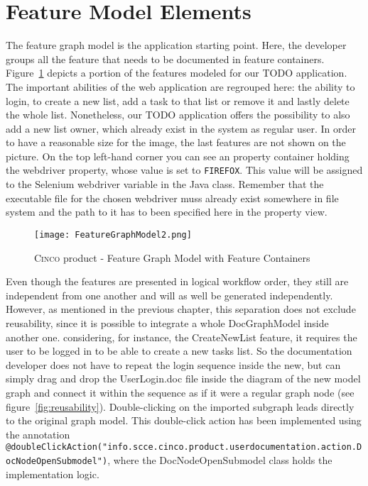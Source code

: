 \section{Feature Model Elements}\label{sec:FeatModElem}

The feature graph model is the application starting point. Here, the developer groups all the feature that needs to be documented in feature containers. Figure~\ref{fig:featGraph} depicts a portion of the features modeled for our TODO application. The important abilities of the web application are regrouped here: the ability to login, to create a new list, add a task to that list or remove it and lastly delete the whole list. Nonetheless, our TODO application offers the possibility to also add a new list owner, which already exist in the system as regular user. In order to have a reasonable size for the image, the last features are not shown on the picture. On the top left-hand corner you can see an property container holding the webdriver property, whose value is set to \lstinline[language=MGL]{FIREFOX}. This value will be assigned to the Selenium webdriver variable in the Java class. Remember that the executable file for the chosen webdriver muss already exist somewhere in file system and the path to it has to been specified here in the property view.

\begin{figure}[H]
    \centering
    \texttt{[image: FeatureGraphModel2.png]}
    \caption{\textsc{Cinco} product - Feature Graph Model with Feature Containers}
    \label{fig:featGraph}
\end{figure}

Even though the features are presented in logical workflow order, they still are independent from one another and will as well be generated independently. However, as mentioned in the previous chapter, this separation does not exclude reusability, since it is possible to integrate a whole DocGraphModel inside another one. considering, for instance, the CreateNewList feature, it requires the user to be logged in to be able to create a new tasks list. So the documentation developer does not have to repeat the login sequence inside the new, but can simply drag and drop the UserLogin.doc file inside the diagram of the new model graph and connect it within the sequence as if it were a regular graph node (see figure~\ref{fig:reusability}). Double-clicking on the imported subgraph leads directly to the original graph model. This double-click action has been implemented using the annotation \lstinline[language=MGL]{@doubleClickAction("info.scce.cinco.product.userdocumentation.action.DocNodeOpenSubmodel")}, where the DocNodeOpenSubmodel class holds the implementation logic.

